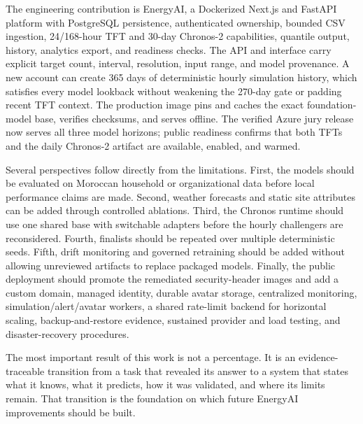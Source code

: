 The engineering contribution is EnergyAI, a Dockerized Next.js and FastAPI platform with PostgreSQL persistence, authenticated ownership, bounded CSV ingestion, 24/168-hour TFT and 30-day Chronos-2 capabilities, quantile output, history, analytics export, and readiness checks. The API and interface carry explicit target count, interval, resolution, input range, and model provenance. A new account can create 365 days of deterministic hourly simulation history, which satisfies every model lookback without weakening the 270-day gate or padding recent TFT context. The production image pins and caches the exact foundation-model base, verifies checksums, and serves offline. The verified Azure jury release now serves all three model horizons; public readiness confirms that both TFTs and the daily Chronos-2 artifact are available, enabled, and warmed.

Several perspectives follow directly from the limitations. First, the models should be evaluated on Moroccan household or organizational data before local performance claims are made. Second, weather forecasts and static site attributes can be added through controlled ablations. Third, the Chronos runtime should use one shared base with switchable adapters before the hourly challengers are reconsidered. Fourth, finalists should be repeated over multiple deterministic seeds. Fifth, drift monitoring and governed retraining should be added without allowing unreviewed artifacts to replace packaged models. Finally, the public deployment should promote the remediated security-header images and add a custom domain, managed identity, durable avatar storage, centralized monitoring, simulation/alert/avatar workers, a shared rate-limit backend for horizontal scaling, backup-and-restore evidence, sustained provider and load testing, and disaster-recovery procedures.

The most important result of this work is not a percentage. It is an evidence-traceable transition from a task that revealed its answer to a system that states what it knows, what it predicts, how it was validated, and where its limits remain. That transition is the foundation on which future EnergyAI improvements should be built.
